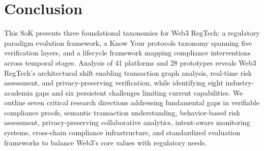 \section{Conclusion}
\label{sec:conclusion}

This SoK presents three foundational taxonomies for Web3 RegTech: a regulatory paradigm evolution framework, a Know Your protocols taxonomy spanning five verification layers, and a lifecycle framework mapping compliance interventions across temporal stages.
Analysis of 41 platforms and 28 prototypes reveals Web3 RegTech's architectural shift enabling transaction graph analysis, real-time risk assessment, and privacy-preserving verification, while identifying eight industry-academia gaps and six persistent challenges limiting current capabilities.
We outline seven critical research directions addressing fundamental gaps in verifiable compliance proofs, semantic transaction understanding, behavior-based risk assessment, privacy-preserving collaborative analytics, intent-aware monitoring systems, cross-chain compliance infrastructure, and standardized evaluation frameworks to balance Web3's core values with regulatory needs.